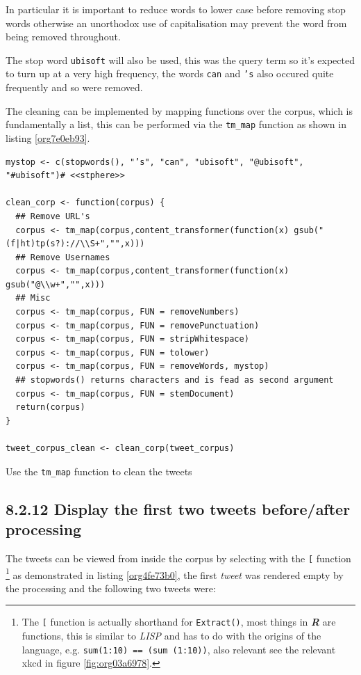 \documentclass[11pt]{article}
\begin{document}
In particular it is important to reduce words to lower case before removing stop words otherwise an unorthodox use of capitalisation may prevent the word from being removed throughout.

The stop word \texttt{ubisoft} will also be used, this was the query term so it's expected to turn up at a very high frequency, the words \texttt{can} and \texttt{'s} also occured quite frequently and so were removed.

The cleaning can be implemented by mapping functions over the corpus, which is fundamentally a list, this can be performed via the \texttt{tm\_map} function as shown in listing \ref{org7e0eb93}.



\begin{listing}[htbp]
\begin{verbatim}
mystop <- c(stopwords(), "’s", "can", "ubisoft", "@ubisoft", "#ubisoft")# <<stphere>>

clean_corp <- function(corpus) {
  ## Remove URL's
  corpus <- tm_map(corpus,content_transformer(function(x) gsub("(f|ht)tp(s?)://\\S+","",x)))
  ## Remove Usernames
  corpus <- tm_map(corpus,content_transformer(function(x) gsub("@\\w+","",x)))
  ## Misc
  corpus <- tm_map(corpus, FUN = removeNumbers)
  corpus <- tm_map(corpus, FUN = removePunctuation)
  corpus <- tm_map(corpus, FUN = stripWhitespace)
  corpus <- tm_map(corpus, FUN = tolower)
  corpus <- tm_map(corpus, FUN = removeWords, mystop)
  ## stopwords() returns characters and is fead as second argument
  corpus <- tm_map(corpus, FUN = stemDocument)
  return(corpus)
}

tweet_corpus_clean <- clean_corp(tweet_corpus)
\end{verbatim}
\caption{\label{org7e0eb93}Use the \texttt{tm\_map} function to clean the tweets}
\end{listing}

\subsection{8.2.12 Display the first two tweets before/after processing}
\label{sec:orgb6a3f7c}
The tweets can be viewed from inside the corpus by selecting with the \texttt{[} function \footnote{The \texttt{[} function is actually shorthand for \texttt{Extract()}, most things in
\textbf{\emph{R}} are functions, this is similar to \emph{LISP} and has to do with the origins of
the language, e.g. \texttt{sum(1:10) == (sum (1:10))}, also relevant see the relevant
xkcd in figure \ref{fig:org03a6978}.} as demonstrated in listing \ref{org4fe73b0}, the first \emph{tweet} was rendered empty by the processing and the following two tweets were:
\end{document}
